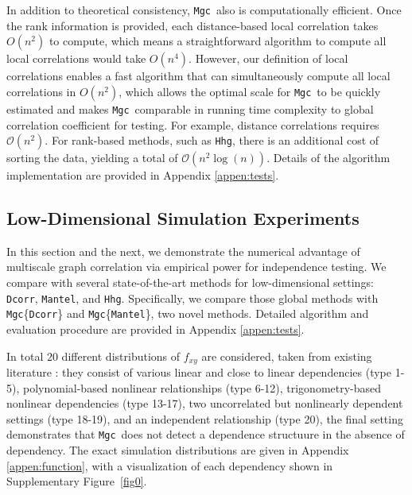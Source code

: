 \documentclass[11pt]{article}
\providecommand{\sct}[1]{{\sc \texttt{#1}}}
\newcommand{\Mgc}{\sct{Mgc}}
\newcommand{\Hhg}{\sct{Hhg}}
\newcommand{\Dcorr}{\sct{Dcorr}}
\newcommand{\Mcorr}{\sct{Mcorr}}
\newcommand{\Mantel}{\sct{Mantel}}
\begin{document}
In addition to theoretical consistency, \Mgc~also is computationally efficient. Once the rank information is provided, each distance-based local correlation takes $O(n^2)$ to compute, which means a straightforward algorithm to compute all local correlations would take $O(n^4)$. However, our definition of local correlations enables a fast algorithm that can simultaneously compute all local correlations in $O(n^2)$, which allows the optimal scale for \Mgc~to be quickly estimated and makes \Mgc~comparable in running time complexity to global correlation coefficient for testing. For example, distance correlations requires $\mathcal{O}(n^2)$.  For rank-based methods, such as \Hhg, there is an additional cost of sorting the data, yielding a total of  $\mathcal{O}(n^2\log(n))$. Details of the algorithm implementation are provided in Appendix \ref{appen:tests}.

\subsection{Low-Dimensional Simulation Experiments}
\label{numer1}
In this section and the next, we demonstrate the numerical advantage of multiscale graph correlation via  empirical power for independence testing. We compare with several state-of-the-art methods for low-dimensional settings: \Dcorr, \Mantel, and \Hhg.  Specifically, we compare those global methods with \Mgc\{\Dcorr\} and \Mgc\{\Mantel\}, two novel methods. 
 Detailed algorithm and evaluation procedure are provided in Appendix \ref{appen:tests}.

In total $20$ different distributions of $f_{xy}$ are considered, taken from existing literature \cite{SzekelyRizzoBakirov2007, SimonTibshirani2012, GorfineHellerHeller2012, HellerGorfine2013}: they consist of various linear and close to linear dependencies (type 1-5), polynomial-based nonlinear relationships (type 6-12), trigonometry-based nonlinear dependencies (type 13-17), two uncorrelated but nonlinearly dependent settings (type 18-19), and an independent relationship (type 20), the final setting demonstrates that \Mgc~does not detect a dependence structuure in the absence of dependency. The exact simulation distributions are given in Appendix \ref{appen:function}, with a visualization of each dependency shown in Supplementary Figure~\ref{fig0}.
\end{document}

